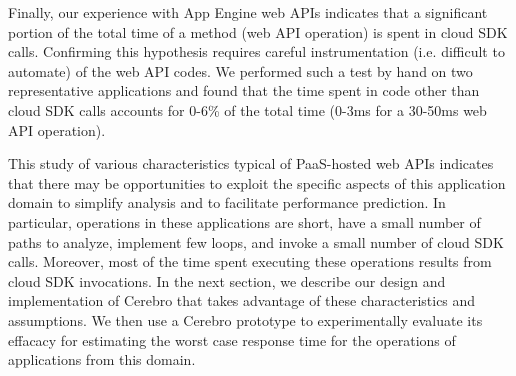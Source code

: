 Finally, our experience with App Engine web APIs indicates that a significant
portion of the total time of a method (web API operation) is spent in cloud SDK calls.
Confirming this hypothesis requires careful instrumentation (i.e. difficult
to automate) of the web API codes.  We performed such a test by hand on two 
representative applications and found that the time spent in code other than cloud SDK calls
accounts for $0$-$6$\% of the total time (0-3ms for a 30-50ms web API operation).

This study of various characteristics typical of 
PaaS-hosted web APIs indicates that there may be 
opportunities to exploit the specific aspects of this
application domain to simplify analysis and to facilitate
performance prediction.  In particular, operations in these applications
are short, have a small number of paths to analyze, implement few
loops, and invoke a small number of cloud SDK calls. Moreover, most
of the time spent executing these operations results from cloud SDK invocations.
In the next section, we describe our design and implementation of Cerebro
that takes advantage of these characteristics and assumptions.
We then use a Cerebro prototype to experimentally evaluate its effacacy
for estimating the worst case response time for the operations of 
applications from this domain.


